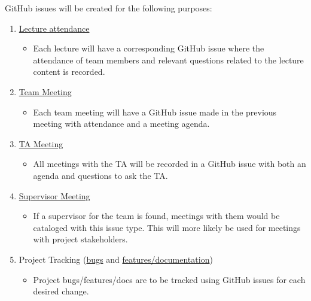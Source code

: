 \documentclass{article}
\begin{document}
GitHub issues will be created for the following purposes:

\begin{enumerate}
    \item \href{https://github.com/russellrd/realm/blob/main/.github/ISSUE_TEMPLATE/lect.md}{Lecture attendance}
    \begin{itemize}
        \item Each lecture will have a corresponding GitHub issue where the attendance of team members and relevant questions related to the lecture content is recorded.
    \end{itemize}
    \item \href{https://github.com/russellrd/realm/blob/main/.github/ISSUE_TEMPLATE/team_meet.md}{Team Meeting}
    \begin{itemize}
        \item Each team meeting will have a GitHub issue made in the previous meeting with attendance and a meeting agenda.
    \end{itemize}
    \item \href{https://github.com/russellrd/realm/blob/main/.github/ISSUE_TEMPLATE/ta_meet.md}{TA Meeting}
    \begin{itemize}
        \item All meetings with the TA will be recorded in a GitHub issue with both an agenda and questions to ask the TA.
    \end{itemize}
    \item \href{https://github.com/russellrd/realm/blob/main/.github/ISSUE_TEMPLATE/sup_meet.md}{Supervisor Meeting}
    \begin{itemize}
        \item If a supervisor for the team is found, meetings with them would be cataloged with this issue type. This will more likely be used for meetings with project stakeholders.
    \end{itemize}
    \item Project Tracking (\href{https://github.com/russellrd/realm/blob/main/.github/ISSUE_TEMPLATE/bug.md}{bugs} and \href{https://github.com/russellrd/realm/blob/main/.github/ISSUE_TEMPLATE/feature_or_doc.md}{features/documentation})
    \begin{itemize}
        \item Project bugs/features/docs are to be tracked using GitHub issues for each desired change.
    \end{itemize}
\end{enumerate}
\end{document}
